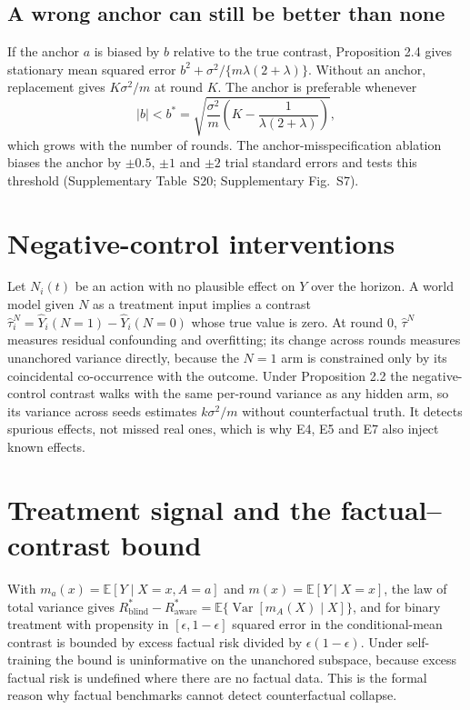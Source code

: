 \documentclass[11pt,a4paper]{article}
\newcommand{\Ex}{\mathbb E}
\newcommand{\Var}{\operatorname{Var}}
\begin{document}
\subsection{A wrong anchor can still be better than none}
If the anchor $a$ is biased by $b$ relative to the true contrast, Proposition 2.4 gives stationary mean squared error $b^2+\sigma^2/\{m\lambda(2+\lambda)\}$. Without an anchor, replacement gives $K\sigma^2/m$ at round $K$. The anchor is preferable whenever
\begin{equation}
|b|<b^*=\sqrt{\frac{\sigma^2}{m}\left(K-\frac{1}{\lambda(2+\lambda)}\right)} ,
\end{equation}
which grows with the number of rounds. The anchor-misspecification ablation biases the anchor by $\pm0.5$, $\pm1$ and $\pm2$ trial standard errors and tests this threshold (Supplementary Table~S20; Supplementary Fig.~S7).

\section{Negative-control interventions}
Let $N_i(t)$ be an action with no plausible effect on $Y$ over the horizon. A world model given $N$ as a treatment input implies a contrast $\hat\tau^N_i=\hat Y_i(N=1)-\hat Y_i(N=0)$ whose true value is zero\cite{lipsitch2010}. At round 0, $\hat\tau^N$ measures residual confounding and overfitting; its change across rounds measures unanchored variance directly, because the $N=1$ arm is constrained only by its coincidental co-occurrence with the outcome. Under Proposition 2.2 the negative-control contrast walks with the same per-round variance as any hidden arm, so its variance across seeds estimates $k\sigma^2/m$ without counterfactual truth. It detects spurious effects, not missed real ones, which is why E4, E5 and E7 also inject known effects.

\section{Treatment signal and the factual--contrast bound}
With $m_a(x)=\Ex[Y\mid X=x,A=a]$ and $m(x)=\Ex[Y\mid X=x]$, the law of total variance gives $R^*_{\mathrm{blind}}-R^*_{\mathrm{aware}}=\Ex\{\Var[m_A(X)\mid X]\}$, and for binary treatment with propensity in $[\epsilon,1-\epsilon]$ squared error in the conditional-mean contrast is bounded by excess factual risk divided by $\epsilon(1-\epsilon)$. Under self-training the bound is uninformative on the unanchored subspace, because excess factual risk is undefined where there are no factual data. This is the formal reason why factual benchmarks cannot detect counterfactual collapse.
\end{document}
